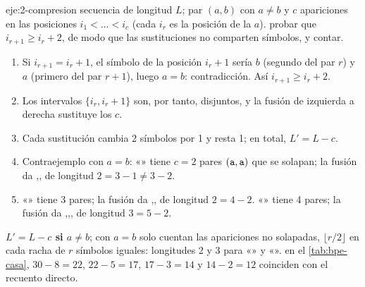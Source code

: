 \begin{solucion}{eje:2-compresion}
\datos secuencia de longitud $L$; par $(a,b)$ con $a\neq b$ y $c$ apariciones en las posiciones $i_1<\dots<i_c$ (cada $i_r$ es la posición de la $a$).
\planteamiento probar que $i_{r+1}\ge i_r+2$, de modo que las sustituciones no comparten símbolos, y contar.
\pasos
\begin{enumerate}[label=\arabic*.]
  \item Si $i_{r+1}=i_r+1$, el símbolo de la posición $i_r+1$ sería $b$ (segundo del par $r$) y $a$ (primero del par $r+1$), luego $a=b$: contradicción. Así $i_{r+1}\ge i_r+2$.
  \item Los intervalos $\{i_r,i_r+1\}$ son, por tanto, disjuntos, y la fusión de izquierda a derecha sustituye los $c$.
  \item Cada sustitución cambia 2 símbolos por 1 y resta 1; en total, $L'=L-c$.
  \item Contraejemplo con $a=b$: «» tiene $c=2$ pares $(\texttt{a},\texttt{a})$ que se solapan; la fusión da \sep{}, de longitud $2=3-1\neq 3-2$.
  \item «» tiene 3 pares; la fusión da \sep{}, de longitud $2=4-2$. «» tiene 4 pares; la fusión da \sep{}\sep{}, de longitud $3=5-2$.
\end{enumerate}
\resultado \textbf{$L'=L-c$ si $a\neq b$}; con $a=b$ solo cuentan las apariciones no solapadas, $\lfloor r/2\rfloor$ en cada racha de $r$ símbolos iguales: longitudes 2 y 3 para «» y «».
\comprobacion en el \cref{tab:bpe-casa}, $30-8=22$, $22-5=17$, $17-3=14$ y $14-2=12$ coinciden con el recuento directo.
\end{solucion}

